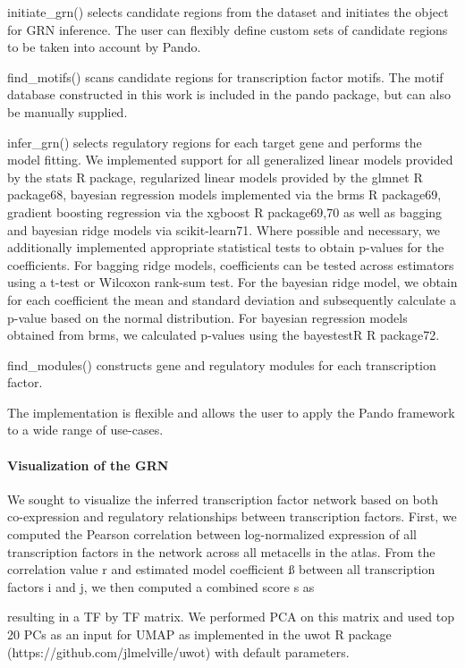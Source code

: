 initiate\_grn() selects candidate regions from the dataset and initiates the object for GRN inference. The user can flexibly define custom sets of candidate regions to be taken into account by Pando.
 
find\_motifs() scans candidate regions for transcription factor motifs. The motif database constructed in this work is included in the pando package, but can also be manually supplied.
 
infer\_grn() selects regulatory regions for each target gene and performs the model fitting. We implemented support for all generalized linear models provided by the stats R package, regularized linear models provided by the glmnet R package68, bayesian regression models implemented via the brms R package69, gradient boosting regression via the xgboost R package69,70 as well as bagging and bayesian ridge models via scikit-learn71. Where possible and necessary, we additionally implemented appropriate statistical tests to obtain p-values for the coefficients. For bagging ridge models, coefficients can be tested across estimators using a t-test or Wilcoxon rank-sum test. For  the bayesian ridge model, we obtain for each coefficient the mean and standard deviation and subsequently calculate a p-value based on the normal distribution. For bayesian regression models obtained from brms, we calculated p-values using the bayestestR R package72.
 
find\_modules() constructs gene and regulatory modules for each transcription factor.
 
The implementation is flexible and allows the user to apply the Pando framework to a wide range of use-cases.
 
\paragraph{Visualization of the GRN}
We sought to visualize the inferred transcription factor network based on both co-expression and regulatory relationships between transcription factors. First, we computed the Pearson correlation between log-normalized expression of all transcription factors in the network across all metacells in the atlas. From the correlation value r and estimated model coefficient ß between all transcription factors i and j, we then computed a combined score s as
 
            
 
resulting in a TF by TF matrix. We performed PCA on this matrix and used top 20 PCs as an input for UMAP as implemented in the uwot R package (https://github.com/jlmelville/uwot) with default parameters.
 
